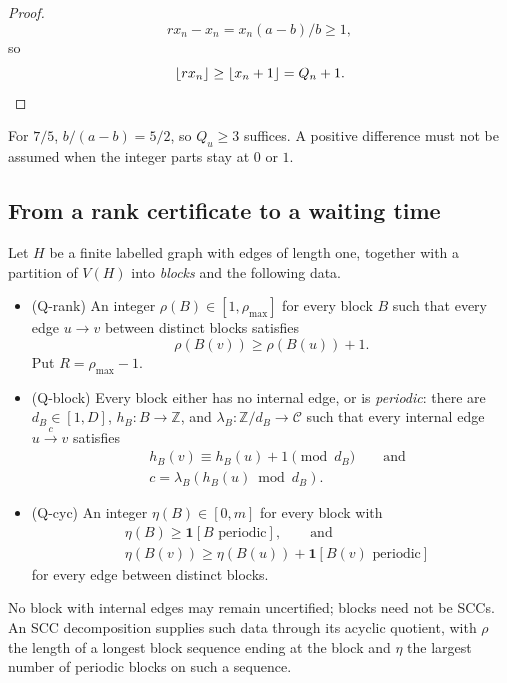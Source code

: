 \documentclass[11pt,reqno]{amsart}
\theoremstyle{definition}
\theoremstyle{remark}
\providecommand{\tightlist}{\setlength{\itemsep}{0pt}\setlength{\parskip}{0pt}}
\begin{document}
\begin{proof}\leavevmode\label{proof:26}
\[
rx_n-x_n=x_n(a-b)/b\ge1,
\]
so
\[
\lfloor rx_n\rfloor\ge\lfloor x_n+1\rfloor=Q_n+1.\qedhere
\]
\end{proof}

For \(7/5\), \(b/(a-b)=5/2\), so \(Q_u\ge3\) suffices. A positive
difference must not be assumed when the integer parts stay at \(0\) or
\(1\).

\subsection{From a rank certificate to a waiting time}\label{sec:6.2}

Let \(H\) be a finite labelled graph with edges of length one, together
with a partition of \(V(H)\) into \emph{blocks} and the following data.

\begin{itemize}
\tightlist
\item
  (Q-rank) An integer \(\rho(B)\in[1,\rho_{\max}]\) for every block
  \(B\) such that every edge \(u\to v\) between distinct blocks satisfies
  \[
  \rho(B(v))\ge\rho(B(u))+1.
  \]
  Put \(R=\rho_{\max}-1\).
\item
  (Q-block) Every block either has no internal edge, or is \emph{periodic}:
  there are \(d_B\in[1,D]\), \(h_B:B\to\mathbb Z\), and
  \(\lambda_B:\mathbb Z/d_B\to\mathcal C\) such that every internal edge
  \(u\xrightarrow{c}v\) satisfies
  \[
  \begin{aligned}
  &h_B(v)\equiv h_B(u)+1\pmod{d_B}\qquad\text{and}\\
  &c=\lambda_B(h_B(u)\bmod d_B).
  \end{aligned}
  \]
\item
  (Q-cyc) An integer \(\eta(B)\in[0,m]\) for every block with
  \[
  \begin{aligned}
  &\eta(B)\ge\mathbf 1[B\text{ periodic}],\qquad\text{and}\\
  &\eta(B(v))\ge\eta(B(u))+\mathbf 1[B(v)\text{ periodic}]
  \end{aligned}
  \]
  for every
  edge between distinct blocks.
\end{itemize}

No block with internal edges may remain uncertified; blocks need not be
SCCs. An SCC decomposition supplies such data through its acyclic
quotient, with \(\rho\) the length of a longest block sequence ending at
the block and \(\eta\) the largest number of periodic blocks on such a
sequence.
\end{document}
